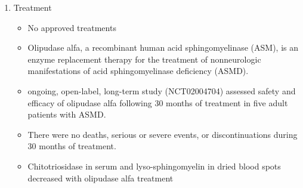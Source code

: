 \documentclass{scrartcl}
\begin{document}
\begin{enumerate}
\item Treatment
\label{sec:org45d73e6}
\begin{itemize}
\item No approved treatments
\item Olipudase alfa, a recombinant human acid sphingomyelinase (ASM), is
an enzyme replacement therapy for the treatment of nonneurologic
manifestations of acid sphingomyelinase deficiency (ASMD).
\item ongoing, open-label, long-term study (NCT02004704) assessed safety
and efficacy of olipudase alfa following 30 months of treatment in
five adult patients with ASMD.
\item There were no deaths, serious or severe events, or discontinuations
during 30 months of treatment.
\item Chitotriosidase in serum and lyso-sphingomyelin in dried blood spots
decreased with olipudase alfa treatment
\end{itemize}
\end{enumerate}
\end{document}
